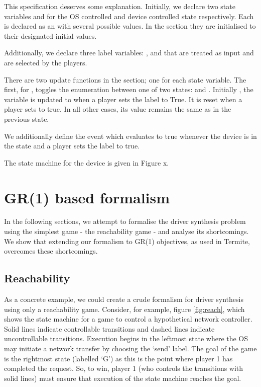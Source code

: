This specification deserves some explanation. Initially, we declare two state variables  and  for the OS controlled and device controlled state respectively. Each is declared as an  with several possible values. In the  section they are initialised to their designated initial values.

Additionally, we declare three label variables: ,  and  that are treated as input and are selected by the players.

There are two update functions in the  section; one for each state variable. The first, for , toggles the enumeration between one of two states:  and . Initially , the variable is updated to  when a player sets the label  to True. It is reset when a player sets  to true. In all other cases, its value remains the same as in the previous state.

We additionally define the  event which evaluates to true whenever the device is in the  state and a player sets the  label to true.

The state machine for the device is given in Figure x. 

\section{GR(1) based formalism}

In the following sections, we attempt to formalise the driver synthesis problem using the simplest game - the reachability game - and analyse its shortcomings. We show that extending our formalism to GR(1) objectives, as used in Termite, overcomes these shortcomings.

\subsection{Reachability}

As a concrete example, we could create a crude formalism for driver synthesis using only a reachability game. Consider, for example, figure \ref{fig:reach}, which shows the state machine for a game to control a hypothetical network controller. Solid lines indicate controllable transitions and dashed lines indicate uncontrollable transitions. Execution begins in the leftmost state where the OS may initiate a network transfer by choosing the `send' label. The goal of the game is the rightmost state (labelled `G') as this is the point where player 1 has completed the request. So, to win, player 1 (who controls the transitions with solid lines) must ensure that execution of the state machine reaches the goal. 

